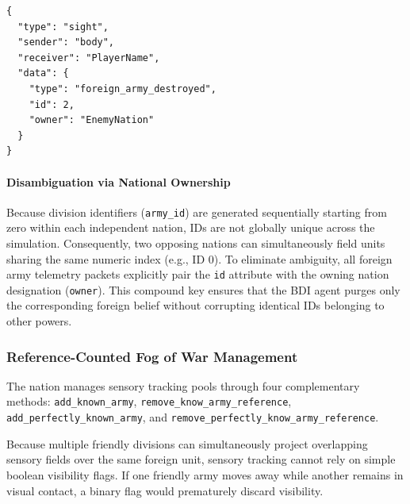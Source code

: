 \begin{lstlisting}[caption={Structure of the foreign army destruction JSON packet.}, label={lst:foreign_army_destroyed_json}]
{
  "type": "sight",
  "sender": "body",
  "receiver": "PlayerName",
  "data": {
    "type": "foreign_army_destroyed",
    "id": 2,
    "owner": "EnemyNation"
  }
}
\end{lstlisting}

\paragraph{Disambiguation via National Ownership}
Because division identifiers (\texttt{army\_id}) are generated sequentially starting from zero within each independent nation, IDs are not globally unique across the simulation. Consequently, two opposing nations can simultaneously field units sharing the same numeric index (e.g., ID $0$). To eliminate ambiguity, all foreign army telemetry packets explicitly pair the \texttt{id} attribute with the owning nation designation (\texttt{owner}). This compound key ensures that the BDI agent purges only the corresponding foreign belief without corrupting identical IDs belonging to other powers.

\subsubsection{Reference-Counted Fog of War Management}
The nation manages sensory tracking pools through four complementary methods: \texttt{add\_known\_army}, \texttt{remove\_know\_army\_reference}, \texttt{add\_perfectly\_known\_army}, and \texttt{remove\_perfectly\_know\_army\_reference}.

Because multiple friendly divisions can simultaneously project overlapping sensory fields over the same foreign unit, sensory tracking cannot rely on simple boolean visibility flags. If one friendly army moves away while another remains in visual contact, a binary flag would prematurely discard visibility.

